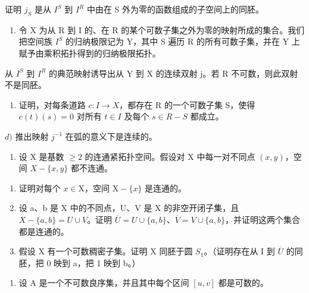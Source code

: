 证明 \(j_{S}\) 是从 \(I^{S}\) 到 \(I^{R}\) 中由在 S 外为零的函数组成的子空间上的同胚。

\begin{enumerate}
\def\labelenumi{\alph{enumi})}
\setcounter{enumi}{1}
\tightlist
\item
  令 X 为从 R 到 I 的、在 R 的某个可数子集之外为零的映射所成的集合。我们把空间族 \(I^{S}\) 的归纳极限记为 Y，其中 S 遍历 R 的所有可数子集，并在 Y 上赋予由乘积拓扑得到的归纳极限拓扑。
\end{enumerate}

从 \(I^{S}\) 到 \(I^{R}\) 的典范映射诱导出从 Y 到 X 的连续双射 j。若 R 不可数，则此双射不是同胚。

\begin{enumerate}
\def\labelenumi{\alph{enumi})}
\setcounter{enumi}{2}
\tightlist
\item
  证明，对每条道路 \(c: I \to X\)，都存在 R 的一个可数子集 S，使得 \(c(t)(s) = 0\) 对所有 \(t \in I\) 及每个 \(s \in R - S\) 都成立。
\end{enumerate}

\(d)\) 推出映射 \(j^{-1}\) 在弧的意义下是连续的。

\begin{enumerate}
\def\labelenumi{\arabic{enumi})}
\setcounter{enumi}{7}
\tightlist
\item
  设 X 是基数 \(\geqslant 2\) 的连通紧拓扑空间。假设对 X 中每一对不同点 \((x,y)\)，空间 \(X - \{x,y\}\) 都不连通。
\end{enumerate}

\begin{enumerate}
\def\labelenumi{\alph{enumi})}
\item
  证明对每个 \(x \in \mathrm{X}\)，空间 \(\mathrm{X} - \{x\}\) 是连通的。
\item
  设 a、b 是 X 中的不同点，U、V 是 X 的非空开闭子集，且 \(X - \{a,b\}=U\cup V\)。证明 \(\overline{U} = U \cup \{a, b\}\)、\(\overline{V} = V \cup \{a, b\}\)，并证明这两个集合都是连通的。
\item
  假设 X 有一个可数稠密子集。证明 X 同胚于圆 \(S_{1}\)。（证明存在从 I 到 \(\overline{U}\) 的同胚，把 0 映到 a，把 1 映到 b。）
\end{enumerate}

\begin{enumerate}
\def\labelenumi{\arabic{enumi})}
\setcounter{enumi}{8}
\tightlist
\item
  设 A 是一个不可数良序集，并且其中每个区间 \([u, v]\) 都是可数的。
\end{enumerate}

